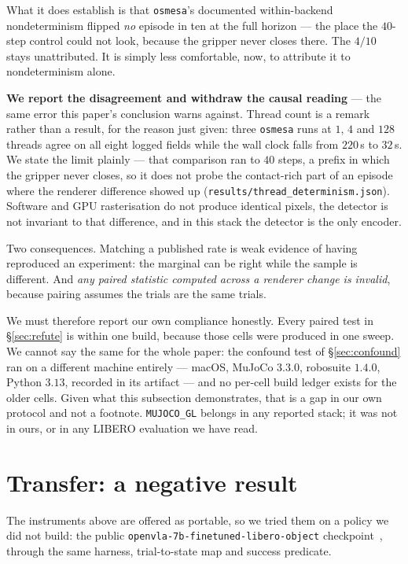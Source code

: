 \documentclass[10pt,twocolumn]{article}
\begin{document}
What it does establish is that \texttt{osmesa}'s documented within-backend
nondeterminism flipped \emph{no} episode in ten at the full horizon --- the
place the $40$-step control could not look, because the gripper never closes
there. The $4/10$ stays unattributed. It is simply less comfortable, now, to
attribute it to nondeterminism alone.

\textbf{We report the disagreement and withdraw the causal reading} --- the
same error this paper's conclusion warns against. Thread count is a remark rather than a result, for the reason just given:
three
\texttt{osmesa} runs at $1$, $4$ and $128$ threads agree on all eight logged
fields while the wall clock falls from $220$\,s to $32$\,s. We state the
limit plainly --- that comparison ran to $40$ steps, a prefix in which the
gripper never closes, so it does not probe the contact-rich part of an
episode where the renderer difference showed up
(\texttt{results/thread\_determinism.json}). Software and GPU
rasterisation do not produce identical pixels, the detector is not invariant to
that difference, and in this stack the detector is the only encoder.

Two consequences. Matching a published rate is weak evidence of having
reproduced an experiment: the marginal can be right while the sample is
different. And \emph{any paired statistic computed across a renderer change is
invalid}, because pairing assumes the trials are the same trials.

We must therefore report our own compliance honestly. Every paired test in
\S\ref{sec:refute} is within one build, because those cells were produced in
one sweep. We cannot say the same for the whole paper: the confound test of
\S\ref{sec:confound} ran on a different machine entirely --- macOS, MuJoCo
$3.3.0$, robosuite $1.4.0$, Python $3.13$, recorded in its artifact --- and no
per-cell build ledger exists for the older cells. Given what this subsection
demonstrates, that is a gap in our own protocol and not a footnote. \texttt{MUJOCO\_GL} belongs in any reported stack; it was
not in ours, or in any LIBERO evaluation we have read.

\section{Transfer: a negative result}
\label{sec:transfer}

The instruments above are offered as portable, so we tried them on a policy we
did not build: the public \texttt{openvla-7b-finetuned-libero-object}
checkpoint~\citep{kim2024openvla}, through the same harness, trial-to-state map
and success predicate.
\end{document}
